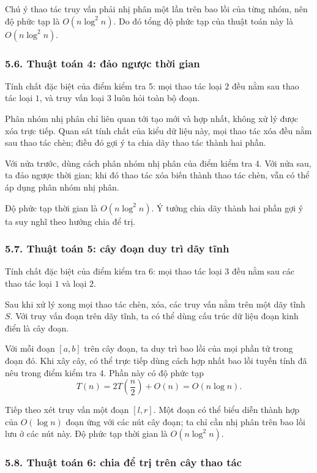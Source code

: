 \documentclass[11pt]{article}
\begin{document}
Chú ý thao tác truy vấn phải nhị phân một lần trên bao lồi của từng nhóm, nên
độ phức tạp là \(O(n\log^2 n)\). Do đó tổng độ phức tạp của thuật toán này là
\(O(n\log^2 n)\).

\subsubsection*{5.6. Thuật toán 4: đảo ngược thời gian}

Tính chất đặc biệt của điểm kiểm tra 5: mọi thao tác loại \(2\) đều nằm sau
thao tác loại \(1\), và truy vấn loại \(3\) luôn hỏi toàn bộ đoạn.

Phân nhóm nhị phân chỉ liên quan tới tạo mới và hợp nhất, không xử lý được xóa
trực tiếp. Quan sát tính chất của kiểu dữ liệu này, mọi thao tác xóa đều nằm
sau thao tác chèn; điều đó gợi ý ta chia dãy thao tác thành hai phần.

Với nửa trước, dùng cách phân nhóm nhị phân của điểm kiểm tra 4. Với nửa sau,
ta đảo ngược thời gian; khi đó thao tác xóa biến thành thao tác chèn, vẫn có
thể áp dụng phân nhóm nhị phân.

Độ phức tạp thời gian là \(O(n\log^2 n)\). Ý tưởng chia dãy thành hai phần gợi
ý ta suy nghĩ theo hướng chia để trị.

\subsubsection*{5.7. Thuật toán 5: cây đoạn duy trì dãy tĩnh}

Tính chất đặc biệt của điểm kiểm tra 6: mọi thao tác loại \(3\) đều nằm sau
các thao tác loại \(1\) và loại \(2\).

Sau khi xử lý xong mọi thao tác chèn, xóa, các truy vấn nằm trên một dãy tĩnh
\(S\). Với truy vấn đoạn trên dãy tĩnh, ta có thể dùng cấu trúc dữ liệu đoạn
kinh điển là cây đoạn.

Với mỗi đoạn \([a,b]\) trên cây đoạn, ta duy trì bao lồi của mọi phần tử trong
đoạn đó. Khi xây cây, có thể trực tiếp dùng cách hợp nhất bao lồi tuyến tính
đã nêu trong điểm kiểm tra 4. Phần này có độ phức tạp
\[
  T(n)=2T\left(\frac n2\right)+O(n)=O(n\log n).
\]

Tiếp theo xét truy vấn một đoạn \([l,r]\). Một đoạn có thể biểu diễn thành
hợp của \(O(\log n)\) đoạn ứng với các nút cây đoạn; ta chỉ cần nhị phân trên
bao lồi lưu ở các nút này. Độ phức tạp thời gian là \(O(n\log^2 n)\).

\subsubsection*{5.8. Thuật toán 6: chia để trị trên cây thao tác}
\end{document}
